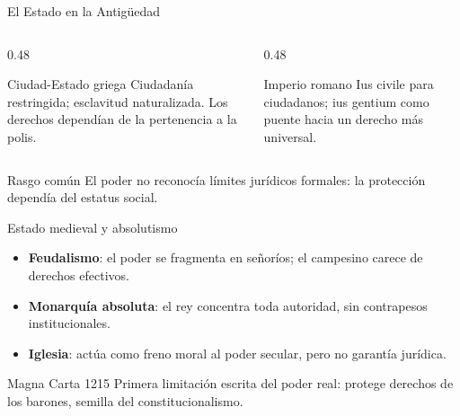 \documentclass[
  spanish,
  aspectratio=169,
  xcolor={dvipsnames,table}
]{beamer}
\begin{document}
\begin{frame}{El Estado en la Antigüedad}
  \begin{columns}[T]
    \begin{column}{0.48\linewidth}
      \begin{block}{Ciudad-Estado griega}
        Ciudadanía restringida; esclavitud naturalizada. Los derechos dependían de la pertenencia a la polis.
      \end{block}
    \end{column}
    \begin{column}{0.48\linewidth}
      \begin{block}{Imperio romano}
        Ius civile para ciudadanos; ius gentium como puente hacia un derecho más universal.
      \end{block}
    \end{column}
  \end{columns}
  \vspace{0.25cm}
  \begin{block}{Rasgo común}
    El poder no reconocía límites jurídicos formales: la protección dependía del estatus social.
  \end{block}
\end{frame}

\begin{frame}{Estado medieval y absolutismo}
  \begin{itemize}
    \item \textbf{Feudalismo}: el poder se fragmenta en señoríos; el campesino carece de derechos efectivos.
    \item \textbf{Monarquía absoluta}: el rey concentra toda autoridad, sin contrapesos institucionales.
    \item \textbf{Iglesia}: actúa como freno moral al poder secular, pero no garantía jurídica.
  \end{itemize}
  \begin{block}{Magna Carta 1215}
    Primera limitación escrita del poder real: protege derechos de los barones, semilla del constitucionalismo.
  \end{block}
\end{frame}
\end{document}
